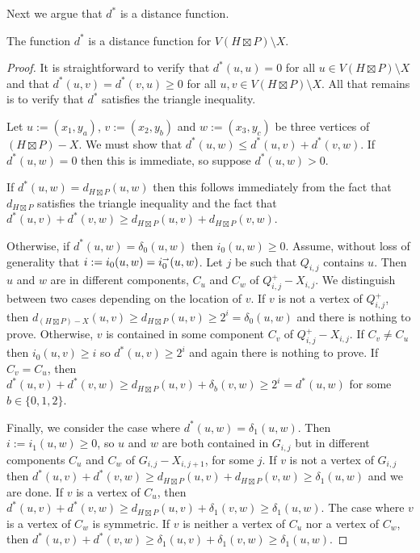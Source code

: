 \documentclass{patmorin}
\renewcommand{\ge}{\geqslant}
\renewcommand{\le}{\leqslant}
\begin{document}
Next we argue that $d^*$ is a distance function.

\begin{lem}\label{d_star_metric}
  The function $d^*$ is a distance function for $V(H\boxtimes P)\setminus X$.
\end{lem}

\begin{proof}
  It is straightforward to verify that $d^*(u,u)=0$ for all $u\in V(H\boxtimes P)\setminus X$ and that $d^*(u,v)=d^*(v,u)\ge 0$ for all $u,v\in V(H\boxtimes P)\setminus X$.  All that remains is to verify that $d^*$ satisfies the triangle inequality.

  Let $u:=(x_1,y_a)$, $v:=(x_2,y_b)$ and $w:=(x_3,y_c)$ be three vertices of $(H\boxtimes P)- X$.  We must show that $d^*(u,w)\le d^*(u,v)+d^*(v,w)$.  If $d^*(u,w)=0$ then this is immediate, so suppose $d^*(u,w)>0$.

  If $d^*(u,w)=d_{H\boxtimes P}(u,w)$ then this follows immediately from the fact that $d_{H\boxtimes P}$ satisfies the triangle inequality and the fact that $d^*(u,v) + d^*(v,w)\ge d_{H\boxtimes P}(u,v)+d_{H\boxtimes P}(v,w)$.

  Otherwise, if $d^*(u,w)=\delta_0(u,w)$ then
  $i_0(u,w)\ge 0$. Assume, without loss of generality that $i:=i_0(u,w)=i_0^{\shortrightarrow}(u,w)$.  Let $j$ be such that $Q_{i,j}$ contains $u$.  Then $u$ and $w$ are in different components, $C_u$ and $C_w$ of $Q^+_{i,j}-X_{i,j}$.  We distinguish between two cases depending on the location of $v$.  If $v$ is not a vertex of $Q^+_{i,j}$, then $d_{(H\boxtimes P)-X}(u,v) \ge d_{H\boxtimes P}(u,v) \ge 2^i=\delta_0(u,w)$ and there is nothing to prove.  Otherwise, $v$ is contained in some component $C_v$ of $Q^+_{i,j}-X_{i,j}$.  If $C_v\neq C_u$ then $i_0(u,v)\ge i$ so $d^*(u,v)\ge 2^i$ and again there is nothing to prove.  If $C_v=C_u$, then $d^*(u,v)+d^*(v,w)\ge d_{H\boxtimes P}(u,v)+\delta_b(v,w)\ge 2^i=d^*(u,w)$ for some $b\in\{0,1,2\}$.

  Finally, we consider the case where $d^*(u,w)=\delta_1(u,w)$. Then $i:=i_1(u,w)\ge 0$, so $u$ and $w$ are both contained in $G_{i,j}$ but in different components $C_u$ and $C_w$ of $G_{i,j}-X_{i,j+1}$, for some $j$.  If $v$ is not a vertex of $G_{i,j}$ then $d^*(u,v)+d^*(v,w)\ge d_{H\boxtimes P}(u,v)+d_{H\boxtimes P}(v,w) \ge \delta_1(u,w)$ and we are done.  If $v$ is a vertex of $C_u$, then $d^*(u,v)+d^*(v,w)\ge d_{H\boxtimes P}(u,v)+\delta_1(v,w)\ge \delta_1(u,w)$. The case where $v$ is a vertex of $C_w$ is symmetric.  If $v$ is neither a vertex of $C_u$ nor a vertex of $C_w$, then $d^*(u,v)+d^*(v,w)\ge \delta_1(u,v) + \delta_1(v,w) \ge \delta_1(u,w)$.
\end{proof}
\end{document}
